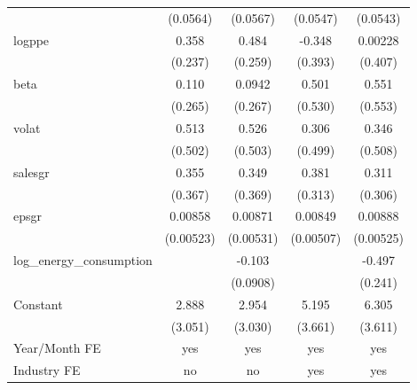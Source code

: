 \begin{table}[htbp]
\begin{tabular}{l*{4}{c}}
                    &    (0.0564)         &    (0.0567)         &    (0.0547)         &    (0.0543)         \\
[1em]
logppe              &       0.358         &       0.484\sym{*}  &      -0.348         &     0.00228         \\
                    &     (0.237)         &     (0.259)         &     (0.393)         &     (0.407)         \\
[1em]
beta                &       0.110         &      0.0942         &       0.501         &       0.551         \\
                    &     (0.265)         &     (0.267)         &     (0.530)         &     (0.553)         \\
[1em]
volat               &       0.513         &       0.526         &       0.306         &       0.346         \\
                    &     (0.502)         &     (0.503)         &     (0.499)         &     (0.508)         \\
[1em]
salesgr             &       0.355         &       0.349         &       0.381         &       0.311         \\
                    &     (0.367)         &     (0.369)         &     (0.313)         &     (0.306)         \\
[1em]
epsgr               &     0.00858         &     0.00871         &     0.00849\sym{*}  &     0.00888\sym{*}  \\
                    &   (0.00523)         &   (0.00531)         &   (0.00507)         &   (0.00525)         \\
[1em]
log\_energy\_consumption&                     &      -0.103         &                     &      -0.497\sym{**} \\
                    &                     &    (0.0908)         &                     &     (0.241)         \\
[1em]
Constant            &       2.888         &       2.954         &       5.195         &       6.305\sym{*}  \\
                    &     (3.051)         &     (3.030)         &     (3.661)         &     (3.611)         \\
\hline
Year/Month FE       &         yes         &         yes         &         yes         &         yes         \\
Industry FE         &          no         &          no         &         yes         &         yes         \\

\end{tabular}
\end{table}
